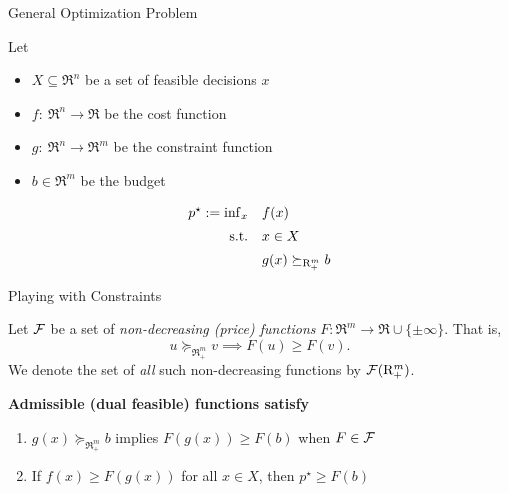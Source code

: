 \documentclass[9pt]{beamer}
\begin{document}
\begin{frame}{General Optimization Problem}

  Let 
  \begin{itemize}
  \item $X \subseteq\Re^n$ be a set of feasible decisions $x$
  \item $f:~\Re^n\to\Re$ be the cost function
  \item $g:~\Re^n\to\Re^m$ be the constraint function
  \item $b\in \Re^m$ be the budget
  \end{itemize}
  
  \vfill

  \begin{tcolorbox}
    \[
      \begin{array}{rl}
        p^\star := \inf_x &  f(x) \\[0.5em]
        \mathrm{s.t.}  & x \in X \\[0.5em]
                           & g(x) \succeq_{\mathrm{R}^m_+} b
      \end{array}
    \]
  \end{tcolorbox}
\end{frame}

\begin{frame}{Playing with Constraints}

  Let $\mathcal F$ be a set of \emph{non-decreasing (price) functions} $F:\Re^m\to\Re\cup\{\pm\infty\}$. That is, 
  \[
    u \succeq_{\Re^m_+} v \implies F(u) \geq F(v).
  \]
  We denote the set of \emph{all} such non-decreasing functions by $\mathcal F(\mathrm{R}^m_+)$.

  \textbf{Admissible (dual feasible) functions satisfy}
  \begin{enumerate}
  \item $g(x) \succeq_{\Re^m_+} b$ implies $F(g(x))\geq F(b)$ when $F\in \mathcal F$
  \item<2-> If $f(x) \geq F(g(x))$ for all $x\in X$, then $p^\star \geq F(b)$
  \end{enumerate}

  \vfill

  
\end{frame}
\end{document}

